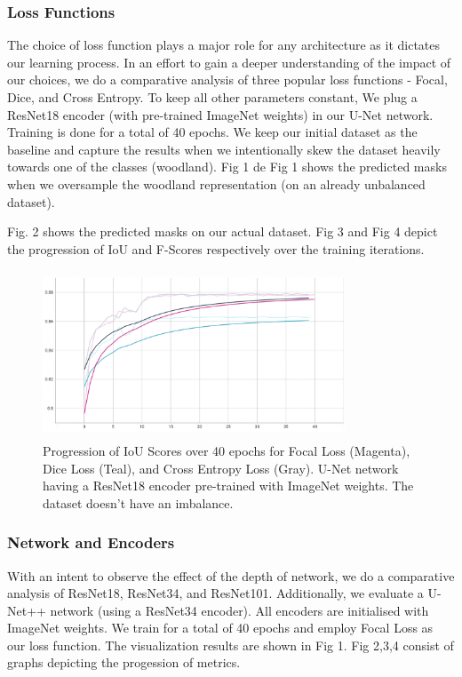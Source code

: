 \documentclass[sigconf, nonacm]{acmart}
\begin{document}
\subsubsection{Loss Functions} The choice of loss function plays a major role for any architecture as it dictates our learning process. In an effort to gain a deeper understanding of the impact of our choices, we do a comparative analysis of three popular loss functions - Focal, Dice, and Cross Entropy. To keep all other parameters constant, We plug a ResNet18 encoder (with pre-trained ImageNet weights) in our U-Net network. Training is done for a total of 40 epochs. We keep our initial dataset as the baseline and capture the results when we intentionally skew the dataset heavily towards one of the classes (woodland). Fig 1 de
Fig 1 shows the predicted masks when we oversample the woodland representation (on an already unbalanced dataset).

Fig. 2 shows the predicted masks on our actual dataset. Fig 3 and Fig 4 depict the progression of IoU and F-Scores respectively over the training iterations.

\begin{figure}[h]
    \includegraphics[width=9cm, height=5cm]{images/roads-losses/three-losses-iou.png}
    \caption{Progression of IoU Scores over 40 epochs for Focal Loss (Magenta), Dice Loss (Teal), and Cross Entropy Loss (Gray). U-Net network having a ResNet18 encoder pre-trained with ImageNet weights. The dataset doesn't have an imbalance. }
\end{figure}

\subsubsection{Network and Encoders} With an intent to observe the effect of the depth of network, we do a comparative analysis of ResNet18, ResNet34, and ResNet101. Additionally, we evaluate a U-Net++ network (using a ResNet34 encoder). All encoders are initialised with ImageNet weights. We train for a total of 40 epochs and employ Focal Loss as our loss function. The visualization results are shown in Fig 1. Fig 2,3,4 consist of graphs depicting the progession of metrics.
\end{document}
